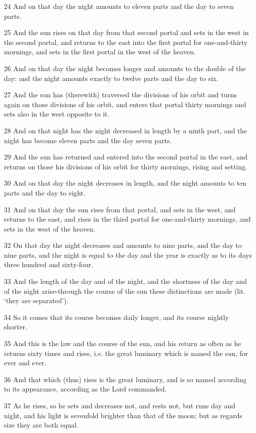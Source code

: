 \par 24 And on that day the night amounts to eleven parts and the day to seven parts.
\par 25 And the sun rises on that day from that second portal and sets in the west in the second portal, and returns to the east into the first portal for one-and-thirty mornings, and sets in the first portal in the west of the heaven.
\par 26 And on that day the night becomes longer and amounts to the double of the day: and the night amounts exactly to twelve parts and the day to six.
\par 27 And the sun has (therewith) traversed the divisions of his orbit and turns again on those divisions of his orbit, and enters that portal thirty mornings and sets also in the west opposite to it.
\par 28 And on that night has the night decreased in length by a ninth part, and the night has become eleven parts and the day seven parts.
\par 29 And the sun has returned and entered into the second portal in the east, and returns on those his divisions of his orbit for thirty mornings, rising and setting.
\par 30 And on that day the night decreases in length, and the night amounts to ten parts and the day to eight.
\par 31 And on that day the sun rises from that portal, and sets in the west, and returns to the east, and rises in the third portal for one-and-thirty mornings, and sets in the west of the heaven.
\par 32 On that day the night decreases and amounts to nine parts, and the day to nine parts, and the night is equal to the day and the year is exactly as to its days three hundred and sixty-four.
\par 33 And the length of the day and of the night, and the shortness of the day and of the night arise-through the course of the sun these distinctions are made (lit. ‘they are separated’).
\par 34 So it comes that its course becomes daily longer, and its course nightly shorter.
\par 35 And this is the law and the course of the sun, and his return as often as he returns sixty times and rises, i.e. the great luminary which is named the sun, for ever and ever.
\par 36 And that which (thus) rises is the great luminary, and is so named according to its appearance, according as the Lord commanded.
\par 37 As he rises, so he sets and decreases not, and rests not, but runs day and night, and his light is sevenfold brighter than that of the moon; but as regards size they are both equal.

